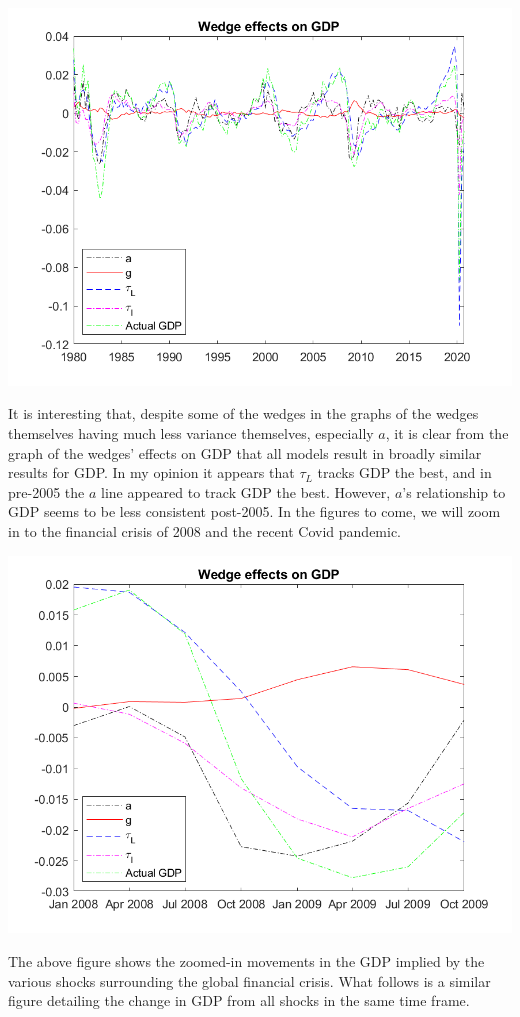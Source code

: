 \documentclass[11pt]{article} %
\begin{document}
\includegraphics{wedgesg}

It is interesting that, despite some of the wedges in the graphs of the wedges themselves having much less variance themselves, especially $a$, it is clear from the graph of the wedges' effects on GDP that all models result in broadly similar results for GDP. In my opinion it appears that $\tau_{L}$ tracks GDP the best, and in pre-2005 the $a$ line appeared to track GDP the best. However, $a$'s relationship to GDP seems to be less consistent post-2005. In the figures to come, we will zoom in to the financial crisis of 2008 and the recent Covid pandemic.

\includegraphics{wedgesfin}

The above figure shows the zoomed-in movements in the GDP implied by the various shocks surrounding the global financial crisis. What follows is a similar figure detailing the change in GDP from all shocks in the same time frame.
\end{document}
